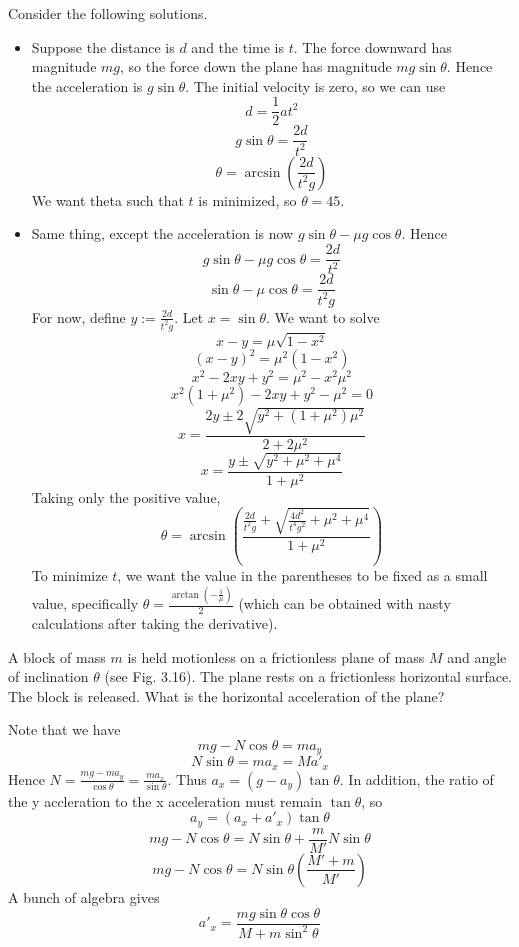 \documentclass[11pt]{scrartcl}
\begin{document}
\begin{soln}
  Consider the following solutions.
  \begin{itemize}
    \item Suppose the distance is $d$ and the time is $t$. The force downward
      has magnitude $mg$, so the force down the plane has magnitude
      $mg\sin\theta$. Hence the acceleration is $g\sin\theta$. The
      initial velocity is zero, so we can use
      $$d=\frac{1}{2}at^2$$
      $$g\sin\theta=\frac{2d}{t^2}$$
      $$\theta=\arcsin\left(\frac{2d}{t^2 g}\right)$$
      We want theta such that $t$ is minimized, so $\theta=45$.
    \item Same thing, except the acceleration is now $g\sin\theta-\mu g\cos\theta$.
      Hence
      $$g\sin\theta-\mu g\cos\theta=\frac{2d}{t^2}$$
      $$\sin\theta-\mu\cos\theta=\frac{2d}{t^2 g}$$
      For now, define $y:=\frac{2d}{t^2 g}$.
      Let $x=\sin\theta$. We want to solve
      $$x-y=\mu \sqrt{1-x^2}$$
      $$(x-y)^2=\mu^2(1-x^2)$$
      $$x^2-2xy+y^2=\mu^2-x^2\mu^2$$
      $$x^2(1+\mu^2)-2xy+y^2-\mu^2=0$$
      $$x=\frac{2y\pm 2\sqrt{y^2+(1+\mu^2)\mu^2}}{2+2\mu^2}$$
      $$x=\frac{y\pm \sqrt{y^2+\mu^2+\mu^4}}{1+\mu^2}$$
      Taking only the positive value,
      $$\theta=\arcsin\left(\frac{\frac{2d}{t^2g}+\sqrt{\frac{4d^2}{t^4g^2}+\mu^2+\mu^4}}{1+\mu^2}\right)$$
      To minimize $t$, we want the value in the parentheses to be fixed as a small value,
      specifically $\theta=\frac{\arctan(-\frac{1}{\mu})}{2}$ (which can be obtained with nasty calculations after taking the derivative).
  \end{itemize}
\end{soln}
\begin{example}
  [3.8]
  A block of mass $m$ is held motionless on a frictionless plane of mass $M$
  and angle of inclination $\theta$ (see Fig. 3.16). The plane rests on a
  frictionless horizontal surface. The block is released. What is the
  horizontal acceleration of the plane?
\end{example}
\begin{soln}
  Note that we have
  $$mg-N\cos\theta=ma_y$$
  $$N\sin\theta=ma_x=Ma'_x$$
  Hence $N=\frac{mg-ma_y}{\cos\theta}=\frac{ma_x}{\sin\theta}$.
  Thus $a_x=(g-a_y)\tan\theta$.
  In addition, the ratio of the y accleration to the x acceleration must
  remain $\tan\theta$, so
  $$a_y=(a_x+a'_x)\tan\theta$$
  $$mg-N\cos\theta=N\sin\theta+\frac{m}{M'}N\sin\theta$$
  $$mg-N\cos\theta=N\sin\theta(\frac{M'+m}{M'})$$
  A bunch of algebra gives
  $$a'_x=\frac{mg\sin\theta\cos\theta}{M+m\sin^2\theta}$$
\end{soln}
\end{document}
